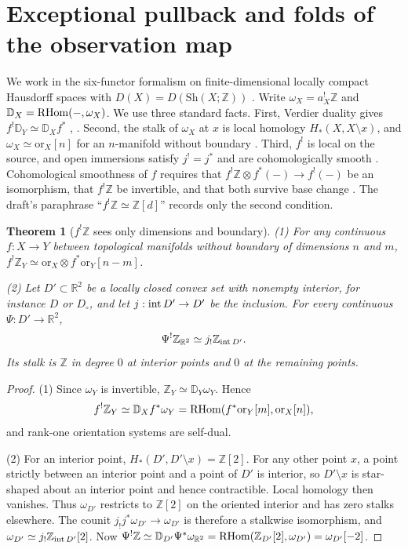 \documentclass[11pt]{article}
\newtheorem{theorem}{Theorem}[section]
\theoremstyle{definition}\newtheorem{definition}[theorem]{Definition}
\theoremstyle{remark}\newtheorem{remark}[theorem]{Remark}
\newcommand{\R}{\mathbb R}\newcommand{\C}{\mathbb C}\newcommand{\Z}{\mathbb Z}
\newcommand{\orr}{\mathrm{or}}
\begin{document}
\section{Exceptional pullback and folds of the observation map}\label{sec:shriek}
We work in the six-functor formalism on finite-dimensional locally compact
Hausdorff spaces with $D(X)=D(\mathrm{Sh}(X;\Z))$ \cite[Example 5.9]{scholze}.
Write $\omega_X=a_X^!\Z$ and $\mathbb D_X=\operatorname{RHom}(-,\omega_X)$. We use three
standard facts. First, Verdier duality gives $f^!\mathbb D_Y\simeq\mathbb D_Xf^*$
\cite[Prop.~4.6.9(3)]{knp}, \cite[Ch.~III]{ks}. Second, the stalk of $\omega_X$
at $x$ is local homology $H_*(X,X\setminus x)$, and $\omega_X\simeq\orr_X[n]$ for
an $n$-manifold without boundary \cite[Rem.~4.6.19, Cor.~4.6.20]{knp}. Third,
$f^!$ is local on the source, and open immersions satisfy $j^!=j^*$ and are
cohomologically smooth \cite[Rem.~5.4]{scholze}. Cohomological smoothness of
$f$ requires that $f^!\Z\otimes f^*(-)\to f^!(-)$ be an isomorphism, that
$f^!\Z$ be invertible, and that both survive base change \cite[Def.~5.1]{scholze}.
The draft's paraphrase ``$f^!\Z\simeq\Z[d]$'' records only the second condition.

\begin{theorem}[$f^!\Z$ sees only dimensions and boundary]\label{thm:shriek}
(1) For any continuous $f:X\to Y$ between topological manifolds without
boundary of dimensions $n$ and $m$,
$f^!\Z_Y\simeq\orr_X\otimes f^*\orr_Y[n-m]$.

(2) Let $D'\subset\R^2$ be a locally closed convex set with nonempty interior,
for instance $D$ or $D_\circ$, and let $j:\operatorname{int} D'\to D'$ be the inclusion. For
every continuous $\Psi:D'\to\R^2$,
\[
 \Psi^!\Z_{\R^2}\simeq j_!\Z_{\inte D'}.
\]
Its stalk is $\Z$ in degree $0$ at interior points and $0$ at the remaining
points.
\end{theorem}
\begin{proof}
(1) Since $\omega_Y$ is invertible, $\Z_Y\simeq\mathbb D_Y\omega_Y$. Hence
\[
 f^!\Z_Y\simeq\mathbb D_Xf^*\omega_Y=\RHom(f^*\orr_Y[m],\orr_X[n]),
\]
and rank-one orientation systems are self-dual.

(2) For an interior point, $H_*(D',D'\setminus x)=\Z[2]$. For any other point
$x$, a point strictly between an interior point and a point of $D'$ is interior,
so $D'\setminus x$ is star-shaped about an interior point and hence
contractible. Local homology then vanishes. Thus $\omega_{D'}$ restricts to
$\Z[2]$ on the oriented interior and has zero stalks elsewhere. The counit
$j_!j^*\omega_{D'}\to\omega_{D'}$ is therefore a stalkwise isomorphism, and
$\omega_{D'}\simeq j_!\Z_{\inte D'}[2]$. Now
$\Psi^!\Z\simeq\mathbb D_{D'}\Psi^*\omega_{\R^2}=\RHom(\Z_{D'}[2],\omega_{D'})=\omega_{D'}[-2]$.
\end{proof}
\end{document}
